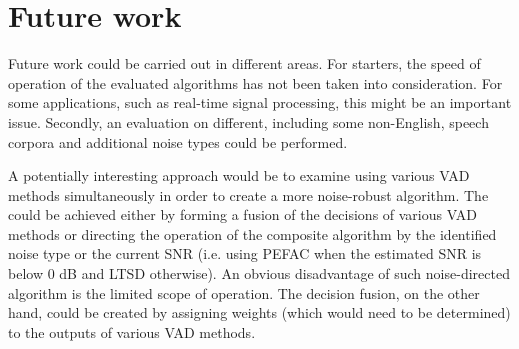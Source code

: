 \section{Future work}

Future work could be carried out in different areas. For starters, the speed of operation of the evaluated algorithms has not been taken into consideration. For some applications, such as real-time signal processing, this might be an important issue. Secondly, an evaluation on different, including some non-English, speech corpora and additional noise types could be performed.

A potentially interesting approach would be to examine using various VAD methods simultaneously in order to create a more noise-robust algorithm. The could be achieved either by forming a fusion of the decisions of various VAD methods or directing the operation of the composite algorithm by the identified noise type or the current SNR (i.e. using PEFAC when the estimated SNR is below 0 dB and LTSD otherwise). An obvious disadvantage of such noise-directed algorithm is the limited scope of operation. The decision fusion, on the other hand, could be created by assigning weights (which would need to be determined) to the outputs of various VAD methods.